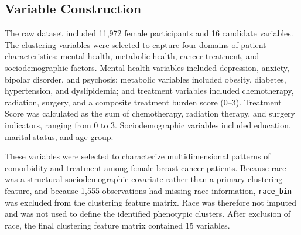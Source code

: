 \documentclass[11pt]{article}
\begin{document}
\subsection{Variable Construction}

The raw dataset included 11,972 female participants and 16 candidate variables. The clustering variables were selected to capture four domains of patient characteristics: mental health, metabolic health, cancer treatment, and sociodemographic factors. Mental health variables included depression, anxiety, bipolar disorder, and psychosis; metabolic variables included obesity, diabetes, hypertension, and dyslipidemia; and treatment variables included chemotherapy, radiation, surgery, and a composite treatment burden score (0–3). Treatment Score was calculated as the sum of chemotherapy, radiation therapy, and surgery indicators, ranging from 0 to 3. Sociodemographic variables included education, marital status, and age group. 

These variables were selected to characterize multidimensional patterns of comorbidity and treatment among female breast cancer patients. 
Because race was a structural sociodemographic covariate rather than a primary clustering feature, and because 1,555 observations had missing race information, \texttt{race\_bin} was excluded from the clustering feature matrix. Race was therefore not imputed and was not used to define the identified phenotypic clusters. After exclusion of race, the final clustering feature matrix contained 15 variables.
 
\end{document}
